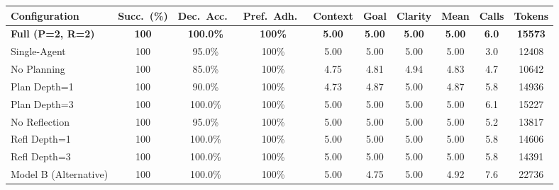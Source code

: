 \begin{tabular}{lccccccccc}
\toprule
Configuration & Succ.\ (\%) & Dec.\ Acc.\ & Pref.\ Adh.\ & Context & Goal & Clarity & Mean & Calls & Tokens \\
\midrule
\textbf{Full (P=2, R=2)} & \textbf{100} & \textbf{100.0\%} & \textbf{100\%} & \textbf{5.00} & \textbf{5.00} & \textbf{5.00} & \textbf{5.00} & \textbf{6.0} & \textbf{15573} \\
Single-Agent & 100 & 95.0\% & 100\% & 5.00 & 5.00 & 5.00 & 5.00 & 3.0 & 12408 \\
No Planning & 100 & 85.0\% & 100\% & 4.75 & 4.81 & 4.94 & 4.83 & 4.7 & 10642 \\
Plan Depth=1 & 100 & 90.0\% & 100\% & 4.73 & 4.87 & 5.00 & 4.87 & 5.8 & 14936 \\
Plan Depth=3 & 100 & 100.0\% & 100\% & 5.00 & 5.00 & 5.00 & 5.00 & 6.1 & 15227 \\
No Reflection & 100 & 95.0\% & 100\% & 5.00 & 5.00 & 5.00 & 5.00 & 5.2 & 13817 \\
Refl Depth=1 & 100 & 100.0\% & 100\% & 5.00 & 5.00 & 5.00 & 5.00 & 5.8 & 14606 \\
Refl Depth=3 & 100 & 100.0\% & 100\% & 5.00 & 5.00 & 5.00 & 5.00 & 5.8 & 14391 \\
Model B (Alternative) & 100 & 100.0\% & 100\% & 5.00 & 4.75 & 5.00 & 4.92 & 7.6 & 22736 \\
\bottomrule
\end{tabular}

